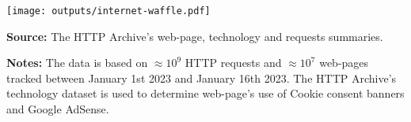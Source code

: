 \documentclass[border=0mm]{article}
\begin{document}
\begin{minipage}{0.05\textwidth}
    \hspace{\fill}
\end{minipage}
\begin{minipage}{0.45\textwidth}
    \vspace*{.2cm}

    \begin{rightframe}[width=1.03\textwidth,arc=10pt,auto outer arc]
    {\texttt{[image: outputs/internet-waffle.pdf]}
    \newline
    \vspace*{-.2cm}

    {\small\linespread{.2}\selectfont\fontsize{8pt}{.2cm}\selectfont
        \textbf{Source:} The HTTP Archive's web-page, technology and requests summaries.

        \textbf{Notes:} The data is based on $\approx 10^9$ HTTP requests and $\approx 10^7$
        web-pages tracked between January 1st 2023 and January 16th 2023.
        The HTTP Archive's technology dataset is used to determine web-page's use of
        Cookie consent banners and Google AdSense.  \par} }
    \end{rightframe}
\end{minipage}
\end{document}

